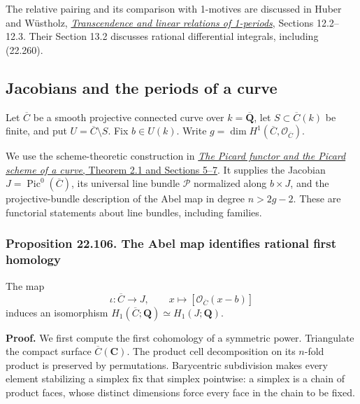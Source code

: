 \documentclass[
  11pt,
  a4paper,
]{article}
\begin{document}
The relative pairing and its comparison with 1-motives are discussed in
Huber and Wüstholz,
\href{https://home.mathematik.uni-freiburg.de/arithgeom/preprints/huber-einsmotive.pdf}{\emph{Transcendence
and linear relations of 1-periods}}, Sections 12.2--12.3. Their Section
13.2 discusses rational differential integrals, including (22.260).

\subsection{Jacobians and the periods of a
curve}\label{jacobians-and-the-periods-of-a-curve}

Let \(\overline C\) be a smooth projective connected curve over
\(k=\overline{\mathbf Q}\), let \(S\subset\overline C(k)\) be finite,
and put \(U=\overline C\setminus S\). Fix \(b\in U(k)\). Write
\(g=\dim H^1(\overline C,\mathcal O_{\overline C})\).

We use the scheme-theoretic construction in
\href{https://kokunoyumeto.github.io/open-math-courses-public/courses/AG-HP/the-picard-functor-and-the-picard-scheme-of-a-curve.html\#7-degree-pieces-abel-fibres-and-properness}{\emph{The
Picard functor and the Picard scheme of a curve}, Theorem 2.1 and
Sections 5--7}. It supplies the Jacobian
\(J=\operatorname{Pic}^0(\overline C)\), its universal line bundle
\(\mathcal P\) normalized along \(b\times J\), and the projective-bundle
description of the Abel map in degree \(n>2g-2\). These are functorial
statements about line bundles, including families.

\subsubsection{Proposition 22.106. The Abel map identifies rational
first
homology}\label{proposition-22.106.-the-abel-map-identifies-rational-first-homology}

The map \[
 \iota:\overline C\longrightarrow J,\qquad
       x\longmapsto[\mathcal O_{\overline C}(x-b)]
 \tag{22.264}
\] induces an isomorphism
\(H_1(\overline C;\mathbf Q)\simeq H_1(J;\mathbf Q)\).

\textbf{Proof.} We first compute the first cohomology of a symmetric
power. Triangulate the compact surface \(\overline C(\mathbf C)\). The
product cell decomposition on its \(n\)-fold product is preserved by
permutations. Barycentric subdivision makes every element stabilizing a
simplex fix that simplex pointwise: a simplex is a chain of product
faces, whose distinct dimensions force every face in the chain to be
fixed.
\end{document}
